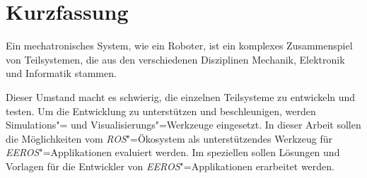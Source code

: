 \chapter*{Kurzfassung}



Ein mechatronisches System, wie ein Roboter, ist ein komplexes Zusammenspiel von Teilsystemen, die aus den verschiedenen Disziplinen Mechanik, Elektronik und Informatik stammen.




Dieser Umstand macht es schwierig, die einzelnen Teilsysteme zu entwickeln und testen.
Um die Entwicklung zu unterstützen und beschleunigen, werden Simulations"= und Visualisierungs"=Werkzeuge eingesetzt.
In dieser Arbeit sollen die Möglichkeiten vom \textit{ROS}"=Ökosystem als unterstützendes Werkzeug für \textit{EEROS}"=Applikationen evaluiert werden.
Im speziellen sollen Lösungen und Vorlagen für die Entwickler von \textit{EEROS}"=Applikationen erarbeitet werden.


